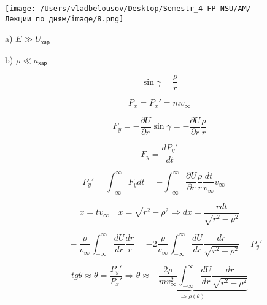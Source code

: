 \documentclass[12pt, a4paper]{report}
\begin{document}
\begin{center}
    \texttt{[image: /Users/vladbelousov/Desktop/Semestr\_4-FP-NSU/АМ/Лекции\_по\_дням/image/8.png]}
\end{center}

a) \( E \gg U_{\text{хар}}    \) 

b) \( \rho \ll a_{\text{хар}}   \) 

\[ \sin  \gamma = \frac{\rho}{r }    \] 

\[ P_x = P_x' = m v_{\infty }  \] 

\[ F_y= - \frac{\partial  U }{\partial  r }\sin  \gamma= - \frac{\partial  U }{\partial  r } \frac{\rho}{r}    \] 

\[ F_y= \frac{d P_y ' }{dt}  \] 

\[ P_y' = \int_{-\infty}^{\infty} F_y dt = - \int_{-\infty}^{\infty} \frac{\partial  U }{\partial  r } \frac{\rho}{r } \frac{dt}{v_{\infty  } } v_{\infty } \boxed{= }     \] 

\[ x= t v_{\infty  } \quad  x= \sqrt{r ^2 - \rho ^2 } \Rightarrow dx = \frac{r dt }{\sqrt{r ^2 - \rho ^2 }}   \] 

\[ \boxed{= } - \frac{\rho}{v_{\infty  } } \int_{-\infty}^{\infty} \frac{d U }{dr } \frac{dr}{r } = -2 \frac{\rho}{v_{\infty  } }\int_{-\infty}^{\infty} \frac{dU}{dr }     \frac{dr}{\sqrt{r ^2 - \rho ^2 } } = P_y'     \] 

\[ tg \theta \approx \theta = \frac{P_y ' }{ P_x ' } \Rightarrow  \underbrace{\boxed{\theta \approx - \frac{2 \rho }{m v_{\infty  } ^2 } \int _{-\infty}^{\infty} \frac{d U }{dr } \frac{dr}{\sqrt{r ^2 - \rho ^2 } }  } }_{\displaystyle \Rightarrow \rho(\theta) }   \] 


\ifdefined\mainfile
\else
    
\end{document}
